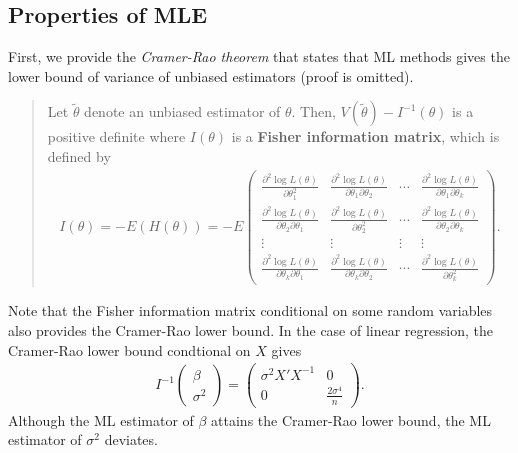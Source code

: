 \documentclass[
  12pt,
]{article}
\begin{document}
\hypertarget{properties-of-mle}{%
\subsection{Properties of MLE}\label{properties-of-mle}}

First, we provide the \emph{Cramer-Rao theorem} that states that ML methods gives the lower bound of variance of unbiased estimators
(proof is omitted).

\begin{quote}
Let \(\tilde{\theta}\) denote an unbiased estimator of \(\theta\). Then, \(V(\tilde{\theta}) - I^{-1}(\theta)\) is a positive definite where
\(I(\theta)\) is a \textbf{Fisher information matrix}, which is defined by
\begin{align*}
I(\theta) 
= - E (H(\theta)) 
= - E 
\begin{pmatrix}
\frac{\partial^2 \log L(\theta) }{\partial \theta_1^2} &
\frac{\partial^2 \log L(\theta) }{\partial \theta_1 \partial \theta_2} &
\cdots &
\frac{\partial^2 \log L(\theta) }{\partial \theta_1 \partial \theta_k} \\
\frac{\partial^2 \log L(\theta) }{\partial \theta_2 \partial \theta_1} &
\frac{\partial^2 \log L(\theta) }{\partial \theta_2^2} &
\cdots &
\frac{\partial^2 \log L(\theta) }{\partial \theta_2 \partial \theta_k} \\
\vdots & \vdots & \vdots & \vdots \\
\frac{\partial^2 \log L(\theta) }{\partial \theta_k \partial \theta_1} &
\frac{\partial^2 \log L(\theta) }{\partial \theta_k \partial \theta_2} &
\cdots &
\frac{\partial^2 \log L(\theta) }{\partial \theta_k^2}
\end{pmatrix}.
\end{align*}
\end{quote}

Note that the Fisher information matrix conditional on some random variables
also provides the Cramer-Rao lower bound.
In the case of linear regression, the Cramer-Rao lower bound condtional on \(X\) gives
\begin{align*}
  I^{-1} \begin{pmatrix} \beta \\ \sigma^2 \end{pmatrix}
  = 
  \begin{pmatrix} \sigma^2 X'X^{-1} & 0 \\ 0 & \frac{2\sigma^4}{n} \end{pmatrix}.
\end{align*}
Although the ML estimator of \(\beta\) attains the Cramer-Rao lower bound,
the ML estimator of \(\sigma^2\) deviates.
\end{document}

